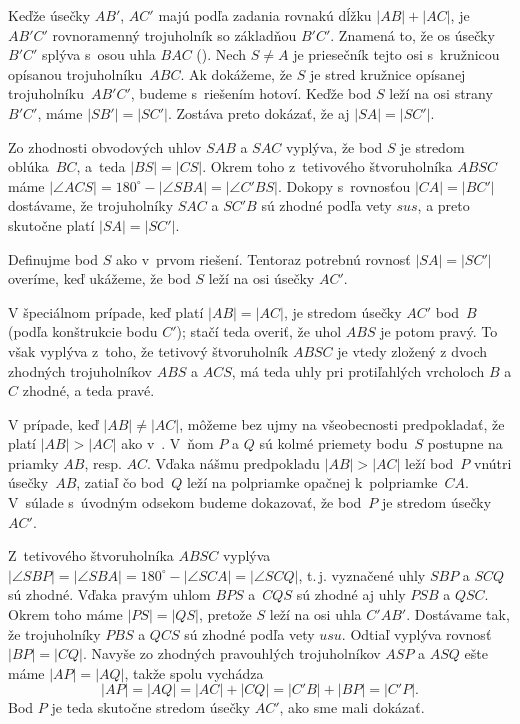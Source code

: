 {%
Keďže úsečky $AB'$, $AC'$ majú podľa zadania rovnakú dĺžku $|AB|+|AC|$,
je $AB'C'$ rovnoramenný trojuholník so základňou $B'C'$. Znamená to, že
os úsečky~$B'C'$ splýva s~osou uhla $BAC$ (\obr).
Nech $S\ne A$ je priesečník tejto osi
s~kružnicou opísanou trojuholníku~$ABC$. Ak dokážeme, že $S$ je stred
kružnice opísanej trojuholníku~$AB'C'$, budeme s~riešením hotoví. Keďže
bod $S$ leží na osi strany $B'C'$, máme $|SB'|=|SC'|$.
Zostáva preto dokázať, že aj $|SA|=|SC'|$.
%

Zo zhodnosti obvodových uhlov $SAB$ a $SAC$ vyplýva, že bod $S$ je
stredom oblúka~$BC$, a~teda $|BS|=|CS|$. Okrem toho
z~tetivového štvoruholníka $ABSC$ máme
$|\angle ACS| = 180^\circ - |\angle SBA| =|\angle C'BS|$.
Dokopy s~rovnosťou $|CA| = |BC'|$ dostávame, že trojuholníky
$SAC$ a $SC'B$ sú zhodné podľa vety $sus$, a preto skutočne
platí $|SA| = |SC'|$.

  \Jres
Definujme bod $S$ ako v~prvom riešení. Tentoraz potrebnú
rovnosť $|SA| = |SC'|$ overíme, keď ukážeme, že bod $S$
leží na osi úsečky $AC'$.

V špeciálnom prípade, keď platí $|AB|=|AC|$, je stredom úsečky $AC'$
bod~$B$ (podľa konštrukcie bodu $C'$); stačí teda overiť, že
uhol $ABS$ je potom pravý. To však vyplýva z~toho, že tetivový štvoruholník
$ABSC$ je vtedy zložený z dvoch zhodných trojuholníkov $ABS$ a $ACS$, má teda uhly
pri protiľahlých vrcholoch $B$ a $C$ zhodné, a teda pravé.

V prípade, keď $|AB|\ne|AC|$, môžeme bez ujmy na všeobecnosti
predpokladať, že platí $|AB|>|AC|$ ako v~\obr.
V~ňom $P$ a $Q$ sú kolmé priemety bodu~$S$ postupne na priamky
$AB$, resp. $AC$. Vďaka nášmu predpokladu $|AB|>|AC|$ leží bod~$P$
vnútri úsečky~$AB$, zatiaľ čo bod~$Q$ leží na polpriamke opačnej
k~polpriamke~$CA$. V~súlade s~úvodným odsekom budeme dokazovať,
že bod~$P$ je stredom úsečky~$AC'$.
%


Z~tetivového štvoruholníka $ABSC$ vyplýva
$|\angle SBP| =|\angle SBA| =180^\circ - |\angle SCA| = |\angle
SCQ|$, t.\,j. vyznačené uhly $SBP$ a $SCQ$ sú zhodné. Vďaka pravým
uhlom $BPS$ a~$CQS$ sú zhodné aj uhly $PSB$ a $QSC$.
Okrem toho máme $|PS| = |QS|$, pretože $S$ leží na osi uhla $C'AB'$.
Dostávame tak, že trojuholníky $PBS$ a $QCS$ sú zhodné podľa
vety $usu$. Odtiaľ vyplýva rovnosť $|BP|=|CQ|$.
Navyše zo zhodných pravouhlých trojuholníkov $ASP$ a $ASQ$ ešte máme $|AP|=|AQ|$,
takže spolu vychádza
$$
|AP|=|AQ|=|AC|+|CQ|=|C'B|+|BP|=|C'P|.
$$
Bod $P$ je teda skutočne stredom úsečky $AC'$, ako sme mali
dokázať.

}
